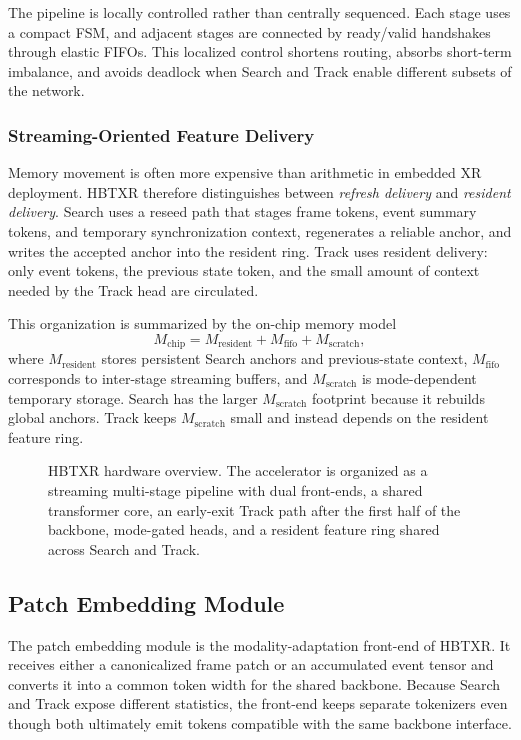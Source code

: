 \documentclass[journal]{IEEEtran}
\newcommand{\placeholderfigure}[2]{%
  \fbox{\parbox[c][#2][c]{#1}{\centering\vspace{2mm}\textbf{Figure placeholder}\\Final artwork pending\vspace{2mm}}}}
\begin{document}
The pipeline is locally controlled rather than centrally sequenced. Each stage uses a compact FSM, and adjacent stages are connected by ready/valid handshakes through elastic FIFOs. This localized control shortens routing, absorbs short-term imbalance, and avoids deadlock when Search and Track enable different subsets of the network.

\subsubsection{Streaming-Oriented Feature Delivery}
Memory movement is often more expensive than arithmetic in embedded XR deployment. HBTXR therefore distinguishes between \emph{refresh delivery} and \emph{resident delivery}. Search uses a reseed path that stages frame tokens, event summary tokens, and temporary synchronization context, regenerates a reliable anchor, and writes the accepted anchor into the resident ring. Track uses resident delivery: only event tokens, the previous state token, and the small amount of context needed by the Track head are circulated.

This organization is summarized by the on-chip memory model
\begin{equation}
M_{\mathrm{chip}} = M_{\mathrm{resident}} + M_{\mathrm{fifo}} + M_{\mathrm{scratch}},
\end{equation}
where $M_{\mathrm{resident}}$ stores persistent Search anchors and previous-state context, $M_{\mathrm{fifo}}$ corresponds to inter-stage streaming buffers, and $M_{\mathrm{scratch}}$ is mode-dependent temporary storage. Search has the larger $M_{\mathrm{scratch}}$ footprint because it rebuilds global anchors. Track keeps $M_{\mathrm{scratch}}$ small and instead depends on the resident feature ring.

\begin{figure}[t]
\centering
\placeholderfigure{0.93\textwidth}{2.15in}
\caption{HBTXR hardware overview. The accelerator is organized as a streaming multi-stage pipeline with dual front-ends, a shared transformer core, an early-exit Track path after the first half of the backbone, mode-gated heads, and a resident feature ring shared across Search and Track.}
\label{fig:hw_overview}
\end{figure}

\subsection{Patch Embedding Module}
The patch embedding module is the modality-adaptation front-end of HBTXR. It receives either a canonicalized frame patch or an accumulated event tensor and converts it into a common token width for the shared backbone. Because Search and Track expose different statistics, the front-end keeps separate tokenizers even though both ultimately emit tokens compatible with the same backbone interface.
\end{document}
